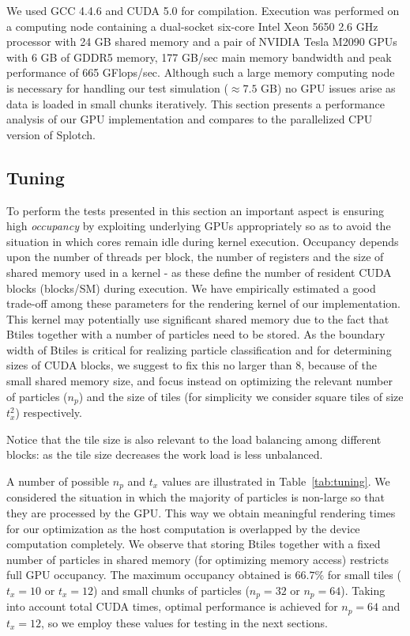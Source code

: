 \documentclass[1p]{elsarticle}
\begin{document}
We used GCC 4.4.6 and CUDA 5.0 for compilation. Execution was performed on a computing node containing a dual-socket six-core Intel Xeon 5650 2.6 GHz processor with 24 GB shared memory and a pair of NVIDIA Tesla M2090 GPUs with 6 GB of GDDR5 memory, 177 GB/sec main memory bandwidth and peak performance of 665 GFlops/sec. Although such a large memory computing node is necessary for handling our test simulation ($\approx 7.5$ GB) no GPU issues arise as data is loaded in small chunks iteratively. This section presents a performance analysis of our GPU implementation and compares to the parallelized CPU version of Splotch. 

\subsection{Tuning}
\label{sec:gpuperf}
To perform the tests presented in this section an important aspect is ensuring high {\it occupancy} by exploiting underlying GPUs appropriately so as to avoid the situation in which cores remain idle during kernel execution. Occupancy depends upon the number of threads per block, the number of registers and the size of shared memory used in a kernel - as these define the number of resident CUDA blocks (blocks/SM) during execution. We have empirically estimated a good trade-off among these parameters for the rendering kernel of our implementation. This kernel may potentially use significant shared memory due to the fact that Btiles together with a number of particles need to be stored. As the boundary width of Btiles is critical for realizing particle classification and for determining sizes of CUDA blocks, we suggest to fix this no larger than 8, because of the small shared memory size, and focus instead on optimizing the relevant number of particles ($n_p$) and the size of tiles (for simplicity we consider square tiles of size $t_x^2$) respectively.
 
Notice that the tile size is also relevant to the load balancing among different blocks: as the tile size decreases the work load is less unbalanced. 

A number of possible $n_p$ and $t_x$ values are illustrated in Table~\ref{tab:tuning}. We considered the situation in which the majority of particles is non-large so that they are processed by the GPU. This way we obtain meaningful rendering times for our optimization as the host computation is overlapped by the device computation completely. We observe that storing Btiles together with a fixed number of particles in shared memory (for optimizing memory access) restricts full GPU occupancy. The maximum occupancy obtained is $66.7\%$ for small tiles ($t_x = 10$ or $t_x = 12$) and small chunks of particles ($n_p = 32$ or $n_p=64$). Taking into account total CUDA times, optimal performance is achieved for $n_p=64$ and $t_x = 12$, so we employ these values for testing in the next sections.
\end{document}
